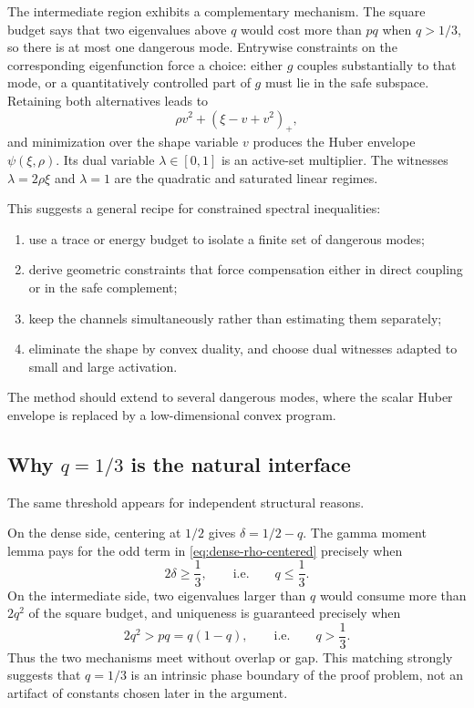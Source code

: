 \documentclass[11pt]{article}
\begin{document}
The intermediate region exhibits a complementary mechanism.  The square
budget says that two eigenvalues above \(q\) would cost more than \(pq\) when
\(q>1/3\), so there is at most one dangerous mode.  Entrywise constraints on
the corresponding eigenfunction force a choice: either \(g\) couples
substantially to that mode, or a quantitatively controlled part of \(g\)
must lie in the safe subspace.  Retaining both alternatives leads to
\[
       \rho v^2+(\xi-v+v^2)_+,
\]
and minimization over the shape variable \(v\) produces the Huber envelope
\(\psi(\xi,\rho)\).  Its dual variable \(\lambda\in[0,1]\) is an active-set
multiplier.  The witnesses \(\lambda=2\rho\xi\) and \(\lambda=1\) are the
quadratic and saturated linear regimes.

This suggests a general recipe for constrained spectral inequalities:
\begin{enumerate}[leftmargin=2.2em]
\item use a trace or energy budget to isolate a finite set of dangerous
      modes;
\item derive geometric constraints that force compensation either in direct
      coupling or in the safe complement;
\item keep the channels simultaneously rather than estimating them
      separately;
\item eliminate the shape by convex duality, and choose dual witnesses
      adapted to small and large activation.
\end{enumerate}
The method should extend to several dangerous modes, where the scalar Huber
envelope is replaced by a low-dimensional convex program.

\subsection{Why \texorpdfstring{\(q=1/3\)}{q=1/3} is the natural interface}

The same threshold appears for independent structural reasons.

On the dense side, centering at \(1/2\) gives
\(\delta=1/2-q\).  The gamma moment lemma pays for the odd term in
\eqref{eq:dense-rho-centered} precisely when
\[
       2\delta\ge\frac13,
       \qquad\text{i.e.}\qquad q\le\frac13.
\]
On the intermediate side, two eigenvalues larger than \(q\) would consume
more than \(2q^2\) of the square budget, and uniqueness is guaranteed
precisely when
\[
       2q^2>pq=q(1-q),
       \qquad\text{i.e.}\qquad q>\frac13.
\]
Thus the two mechanisms meet without overlap or gap.  This matching strongly
suggests that \(q=1/3\) is an intrinsic phase boundary of the proof problem,
not an artifact of constants chosen later in the argument.
\appendix
\end{document}
